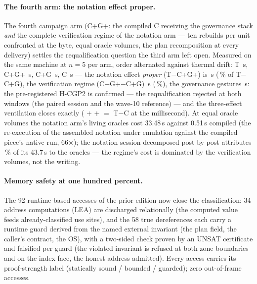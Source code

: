 \documentclass[11pt,a4paper]{article}
\begin{document}
\paragraph{The fourth arm: the notation effect proper.} The fourth
campaign arm (C+G+: the compiled C receiving the governance stack
\emph{and} the complete verification regime of the notation arm ---
ten rebuilds per unit confronted at the byte, equal oracle volumes,
the plan recomposition at every delivery) settles the requalification
question the third arm left open. Measured on the same machine at
$n{=}5$ per arm, order alternated against thermal drift: T
\quatreBrasT{}\,s, C+G+ \quatreBrasCGP{}\,s, C+G \quatreBrasCG{}\,s, C
\quatreBrasC{}\,s --- the notation effect \emph{proper} (T$-$C+G+) is
\effetNotationPropre{}\,s (\partNotationPropre\,\% of T$-$C+G), the
verification regime (C+G+$-$C+G) \effetRegime{}\,s (\partRegime\,\%),
the governance gestures \effetGouvernanceOnze{}\,s: the pre-registered
H-CGP2 is confirmed --- the requalification rejected at both windows
(the paired session and the wave-10 reference) --- and the
three-effect ventilation closes exactly (\effetNotationPropre{} $+$
\effetRegime{} $+$ \effetGouvernanceOnze{} $=$ T$-$C at the millisecond).
At equal oracle volumes the notation arm's living oracles cost 33.48\,s
against 0.51\,s compiled (the re-execution of the assembled notation
under emulation against the compiled piece's native run, 66$\times$);
the notation session decomposed post by post attributes \oraclesPart\,\%
of its 43.7\,s to the oracles --- the regime's cost is dominated by
the verification volumes, not the writing.

\paragraph{Memory safety at one hundred percent.} The 92
runtime-based accesses of the prior edition now close the
classification: 34 address computations (LEA) are discharged
relationally (the computed value feeds already-classified use
sites), and the 58 true dereferences each carry a runtime guard
derived from the named external invariant (the plan field, the
caller's contract, the OS), with a two-sided check proven by an
UNSAT certificate and falsified per guard (the violated invariant is
refused at both zone boundaries and on the index face, the honest
address admitted). Every access carries its proof-strength label
(statically sound / bounded / guarded); zero out-of-frame accesses.
\end{document}
